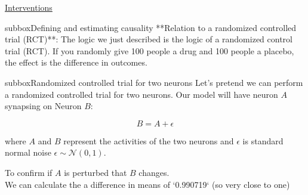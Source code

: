 \begin{textbox}{\href{https://compneuro.neuromatch.io/tutorials/W3D5_NetworkCausality/student/W3D5_Tutorial1.html}{Interventions }   }
\begin{subbox}{subbox}{Defining and estimating causality}
**Relation to a randomized controlled trial (RCT)**:
The logic we just described is the logic of a randomized control trial (RCT). If you randomly give 100 people a drug and 100 people a placebo, the effect is the difference in outcomes.

\end{subbox}
\begin{subbox}{subbox}{Randomized controlled trial for two neurons}
\scriptsize
Let's pretend we can perform a randomized controlled trial for two neurons. Our model will have neuron $A$ synapsing on Neuron $B$:

\begin{equation*}
B = A + \epsilon
\end{equation*}

where $A$ and $B$ represent the activities of the two neurons and $\epsilon$ is standard normal noise $\epsilon\sim\mathcal{N}(0,1)$.

To confirm if  $A$ is perturbed that $B$ changes.\\
We can calculate the a difference in means of `0.990719` (so very close to one)

\end{subbox}
\end{textbox}
